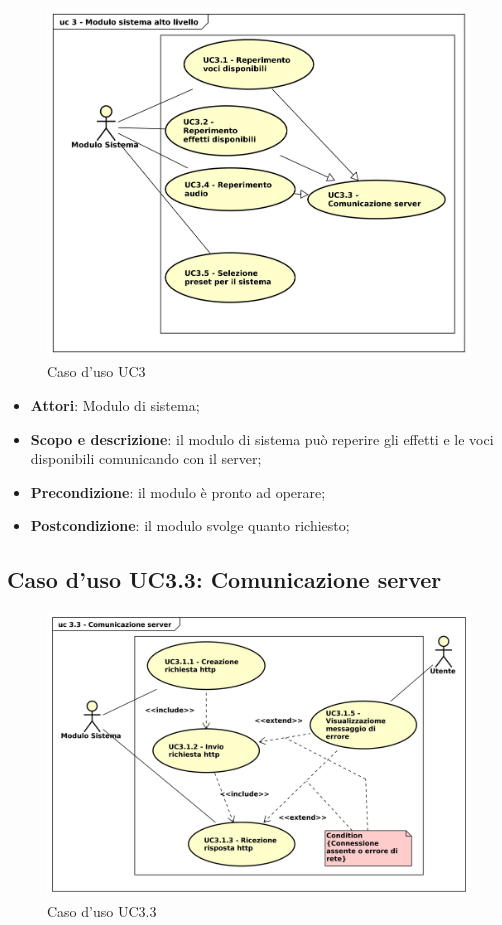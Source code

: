 \begin{figure}[htbp]
\centering
\includegraphics[scale=0.5]{UseCase_17_03_2016/immagini/uc_3_modulo_sistema_alto_livello.png}
\captionsetup{labelfont=bf}
\caption{Caso d'uso UC3}
\end{figure}

\begin{itemize}
\item \textbf{Attori}: Modulo di sistema;
\item \textbf{Scopo e descrizione}: il modulo di sistema può reperire gli effetti e le voci disponibili comunicando con il server;
\item \textbf{Precondizione}: il modulo è pronto ad operare;
\item \textbf{Postcondizione}: il modulo svolge quanto richiesto;
\end{itemize}

\subsection{Caso d'uso UC3.3: Comunicazione server}

\begin{figure}[htbp]
\centering
\includegraphics[scale=0.5]{UseCase_17_03_2016/immagini/uc_3_3_comunicazione_server.png}
\captionsetup{labelfont=bf}
\caption{Caso d'uso UC3.3}
\end{figure}

